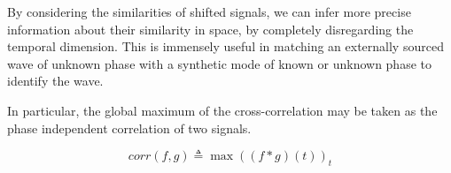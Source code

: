 By considering the similarities of shifted signals, we can infer more precise
information about their similarity in space, by completely disregarding the
temporal dimension. This is immensely useful in matching an externally sourced
wave of unknown phase with a synthetic mode of known or unknown phase to
identify the wave.

In particular, the global maximum of the cross-correlation may be taken as the
phase independent correlation of two signals.

\begin{equation}
    corr(f, g) \triangleq \max((f \ast g) (t))_t
\end{equation}
